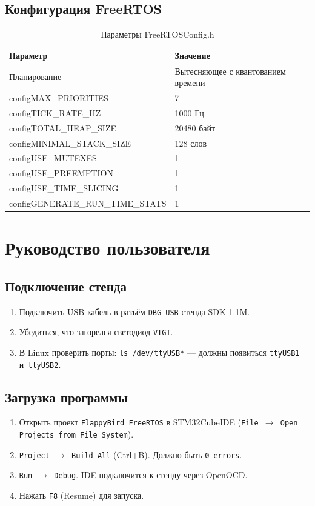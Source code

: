 \documentclass[a4paper,12pt]{article}
\begin{document}
\subsection{Конфигурация FreeRTOS}


\begin{table}[H]
    \centering
    \begin{tabular}{l|l}
        \toprule
        \textbf{Параметр} & \textbf{Значение} \\
        \midrule
        Планирование & Вытесняющее с квантованием времени \\
        configMAX\_PRIORITIES & 7 \\
        configTICK\_RATE\_HZ & 1000 Гц \\
        configTOTAL\_HEAP\_SIZE & 20480 байт \\
        configMINIMAL\_STACK\_SIZE & 128 слов \\
        configUSE\_MUTEXES & 1 \\
        configUSE\_PREEMPTION & 1 \\
        configUSE\_TIME\_SLICING & 1 \\
        configGENERATE\_RUN\_TIME\_STATS & 1 \\
        \bottomrule
    \end{tabular}
    \caption{Параметры FreeRTOSConfig.h}
\end{table}


\section{Руководство пользователя}


\subsection{Подключение стенда}
\begin{enumerate}
    \item Подключить USB-кабель в разъём \texttt{DBG USB} стенда SDK-1.1M.
    \item Убедиться, что загорелся светодиод \texttt{VTGT}.
    \item В Linux проверить порты: \texttt{ls /dev/ttyUSB*} — должны появиться \texttt{ttyUSB1} и~\texttt{ttyUSB2}.
\end{enumerate}


\subsection{Загрузка программы}
\begin{enumerate}
    \item Открыть проект \texttt{FlappyBird\_FreeRTOS} в STM32CubeIDE (\texttt{File $\to$ Open Projects from File System}).
    \item \texttt{Project $\to$ Build All} (Ctrl+B). Должно быть \texttt{0 errors}.
    \item \texttt{Run $\to$ Debug}. IDE подключится к стенду через OpenOCD.
    \item Нажать \texttt{F8} (Resume) для запуска.
\end{enumerate}
\end{document}
